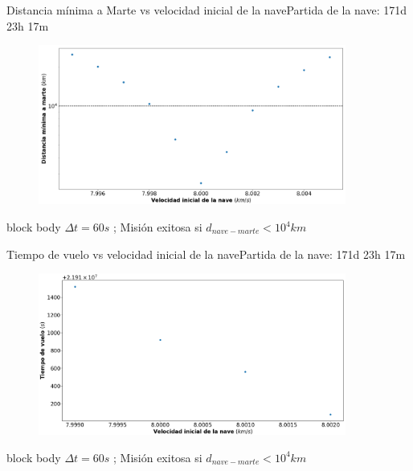 \documentclass{beamer}
\begin{document}
            \begin{frame}{Distancia mínima a Marte vs velocidad inicial de la nave}{Partida de la nave: 171d 23h 17m}
                \begin{figure}[H!]
                    \includegraphics[width=0.9\textwidth]{./min_distance_vs_v0_logaritmica_line_in_10^4_reduced_scatter}
                    \label{fig:marte_10}
                \end{figure}
                \begin{beamercolorbox}[sep=5pt,center]{block body}
                    \centering
                    \small{$\Delta t = 60s$ ; Misión exitosa si $d_{nave-marte} < 10^4 km$}
                \end{beamercolorbox}
            \end{frame}

            \begin{frame}{Tiempo de vuelo vs velocidad inicial de la nave}{Partida de la nave: 171d 23h 17m}
                \begin{figure}[H!]
                    \includegraphics[width=0.9\textwidth]{./time_vs_v0_for_v_less_10^4_scatter}
                    \label{fig:marte_11}
                \end{figure}
                \begin{beamercolorbox}[sep=5pt,center]{block body}
                    \centering
                    \small{$\Delta t = 60s$ ; Misión exitosa si $d_{nave-marte} < 10^4 km$}
                \end{beamercolorbox}
            \end{frame}
\end{document}
